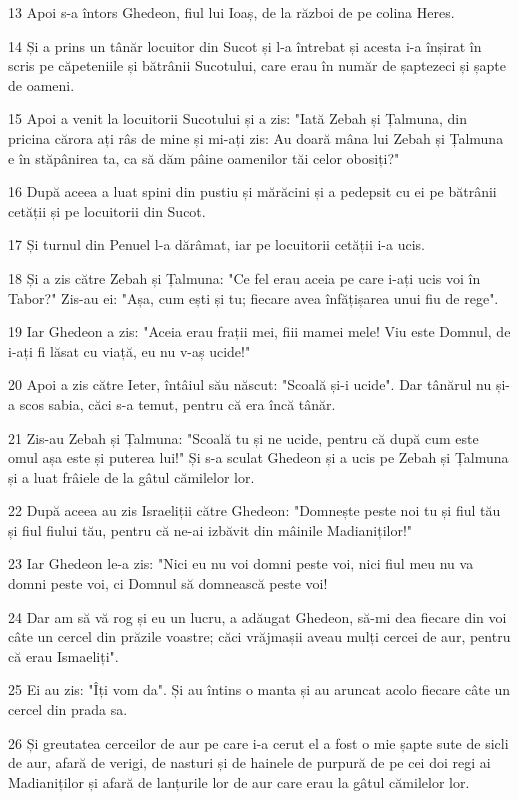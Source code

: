 \par 13 Apoi s-a întors Ghedeon, fiul lui Ioaș, de la război de pe colina Heres.
\par 14 Și a prins un tânăr locuitor din Sucot și l-a întrebat și acesta i-a înșirat în scris pe căpeteniile și bătrânii Sucotului, care erau în număr de șaptezeci și șapte de oameni.
\par 15 Apoi a venit la locuitorii Sucotului și a zis: "Iată Zebah și Țalmuna, din pricina cărora ați râs de mine și mi-ați zis: Au doară mâna lui Zebah și Țalmuna e în stăpânirea ta, ca să dăm pâine oamenilor tăi celor obosiți?"
\par 16 După aceea a luat spini din pustiu și mărăcini și a pedepsit cu ei pe bătrânii cetății și pe locuitorii din Sucot.
\par 17 Și turnul din Penuel l-a dărâmat, iar pe locuitorii cetății i-a ucis.
\par 18 Și a zis către Zebah și Țalmuna: "Ce fel erau aceia pe care i-ați ucis voi în Tabor?" Zis-au ei: "Așa, cum ești și tu; fiecare avea înfățișarea unui fiu de rege".
\par 19 Iar Ghedeon a zis: "Aceia erau frații mei, fiii mamei mele! Viu este Domnul, de i-ați fi lăsat cu viață, eu nu v-aș ucide!"
\par 20 Apoi a zis către Ieter, întâiul său născut: "Scoală și-i ucide". Dar tânărul nu și-a scos sabia, căci s-a temut, pentru că era încă tânăr.
\par 21 Zis-au Zebah și Țalmuna: "Scoală tu și ne ucide, pentru că după cum este omul așa este și puterea lui!" Și s-a sculat Ghedeon și a ucis pe Zebah și Țalmuna și a luat frâiele de la gâtul cămilelor lor.
\par 22 După aceea au zis Israeliții către Ghedeon: "Domnește peste noi tu și fiul tău și fiul fiului tău, pentru că ne-ai izbăvit din mâinile Madianiților!"
\par 23 Iar Ghedeon le-a zis: "Nici eu nu voi domni peste voi, nici fiul meu nu va domni peste voi, ci Domnul să domnească peste voi!
\par 24 Dar am să vă rog și eu un lucru, a adăugat Ghedeon, să-mi dea fiecare din voi câte un cercel din prăzile voastre; căci vrăjmașii aveau mulți cercei de aur, pentru că erau Ismaeliți".
\par 25 Ei au zis: "Îți vom da". Și au întins o manta și au aruncat acolo fiecare câte un cercel din prada sa.
\par 26 Și greutatea cerceilor de aur pe care i-a cerut el a fost o mie șapte sute de sicli de aur, afară de verigi, de nasturi și de hainele de purpură de pe cei doi regi ai Madianiților și afară de lanțurile lor de aur care erau la gâtul cămilelor lor.
